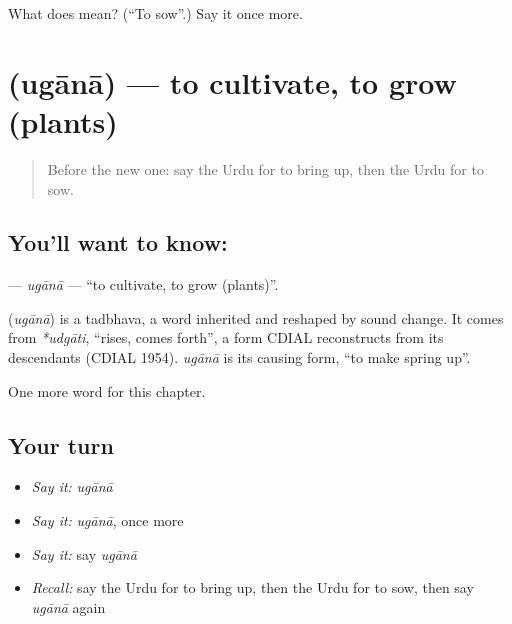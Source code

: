 \begin{tcolorbox}[breakable,colback=teal!4,colframe=teal!35!black,title={Before you move on}]
What does  mean? (\textquotedblleft{}To sow\textquotedblright{}.) Say it once more.
\end{tcolorbox}
\section[\texorpdfstring{\ur{اگانا} (ugānā)}{اگانا (ugānā)}]{ (ugānā) — to cultivate, to grow (plants)}

\label{lesson:UR-C241-ugana}



\begin{quote}
Before the new one: say the Urdu for to bring up, then the Urdu for to sow.
\end{quote}

\subsection*{You'll want to know: }
\textbf{} — \emph{ugānā} — \textquotedblleft{}to cultivate, to grow (plants)\textquotedblright{}.

\begin{cousinweb}
\textbf{} (\emph{ugānā}) is a tadbhava, a word inherited and reshaped by sound change. It comes from \emph{*udgāti}, \textquotedblleft{}rises, comes forth\textquotedblright{}, a form CDIAL reconstructs from its descendants (CDIAL 1954). \emph{ugānā} is its causing form, \textquotedblleft{}to make spring up\textquotedblright{}.
\end{cousinweb}

\begin{grammarlens}[title={What you've built}]
One more word for this chapter.
\end{grammarlens}

\subsection*{Your turn}
\begin{itemize}
\raggedright
  \item \emph{Say it:} \emph{ugānā}
  \item \emph{Say it:} \emph{ugānā}, once more
  \item \emph{Say it:} say \emph{ugānā}
  \item \emph{Recall:} say the Urdu for to bring up, then the Urdu for to sow, then say \emph{ugānā} again
\end{itemize}

